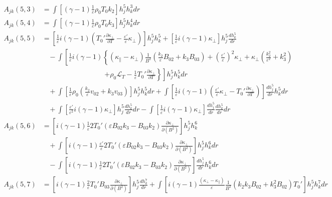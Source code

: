\documentclass[11pt, fleqn]{article}
\newcommand{\HL}{\mathscr{L}}
\newcommand{\eps}{\varepsilon}
\begin{document}
\begin{align*}
	A_{jk}(5, 3) &=  \int \left[(\gamma - 1)\frac{1}{\eps}\rho_0T_0k_2\right] h_j^5 h_k^3 dr															\\
	A_{jk}(5, 4) &=  \int \left[(\gamma - 1)\frac{1}{\eps}\rho_0T_0k_3\right] h_j^5 h_k^4 dr															\\
	A_{jk}(5, 5) &=  \left[\frac{1}{\eps}i(\gamma - 1)\left(T_0'\frac{\partial \kappa_\bot}{\partial T} - \frac{\eps'}{\eps}\kappa_\bot\right)\right] h_j^5 h_k^5 + \left[\frac{1}{\eps}i(\gamma - 1)\kappa_\bot\right]h_j^5 \frac{dh_k^5}{dr} 			\\
				 &~~~~ -\int \left[\frac{1}{\eps}i(\gamma - 1)\left\{(\kappa_\parallel - \kappa_\bot)\frac{1}{B^2}\left(\frac{k_2}{\eps}B_{02} + k_3B_{03}\right) + \left(\frac{\eps'}{\eps}\right)^2\kappa_\bot
				 																																								   + \kappa_\bot\left(\frac{k_2^2}{\eps^2} + k_3^2\right)\right.\right. \\
				 &\qquad\qquad\qquad\qquad~~~~ 									  \left.\left.+ \rho_0\HL_T - \frac{1}{\eps}T_0'\frac{\partial \kappa_\bot}{\partial T}\right\} \right] h_j^5h_k^5 dr													\\
				 &~~~~ +\int \left[\frac{1}{\eps}\rho_0\left(\frac{k_2}{\eps}v_{02} + k_3v_{03}\right)\right] h_j^5 h_k^5 dr 
				 	   +\int\left[\frac{1}{\eps}i(\gamma - 1)\left(\frac{\eps'}{\eps}\kappa_\bot - T_0'\frac{\partial \kappa_\bot}{\partial T}\right)\right] \frac{dh_j^5}{dr} h_k^5 dr																	\\
				 &~~~~ +\int\left[\frac{\eps'}{\eps^2}i(\gamma - 1)\kappa_\bot\right] h_j^5 \frac{dh_k^5}{dr} dr - \int \left[\frac{1}{\eps}i(\gamma - 1)\kappa_\bot\right] \frac{dh_j^5}{dr}\frac{dh_k^5}{dr} dr										\\
	A_{jk}(5, 6) &=  \left[i(\gamma - 1)\frac{1}{\eps}2T_0'(\eps B_{02}k_3 - B_{03}k_2)\frac{\partial \kappa_\bot}{\partial(B^2)}\right] h_j^5 h_k^6	\\
				 &~~~~ + \int \left[i(\gamma - 1)\frac{\eps'}{\eps}2T_0'(\eps B_{02}k_3 - B_{03}k_2)\frac{\partial \kappa_\bot}{\partial(B^2)}\right] h_j^5 h_k^6 dr																					\\
				 &~~~~ - \int \left[i(\gamma - 1)\frac{1}{\eps}2T_0'(\eps B_{02}k_3 - B_{03}k_2)\frac{\partial \kappa_\bot}{\partial(B^2)}\right] \frac{dh_j^5}{dr} h_k^6 dr																			\\
	A_{jk}(5, 7) &=  \left[i(\gamma - 1)\frac{2}{\eps}T_0'B_{03}\frac{\partial \kappa_\bot}{\partial(B^2)}\right] h_j^5 \frac{dh_k^7}{dr} 
												 + \int \left[i(\gamma - 1)\frac{(\kappa_\bot - \kappa_\parallel)}{\eps} \frac{1}{B^2}(k_2k_3B_{02} + k_3^2B_{02})T_0'\right] h_j^5 h_k^7 dr 															\\

\end{align*}
\end{document}
